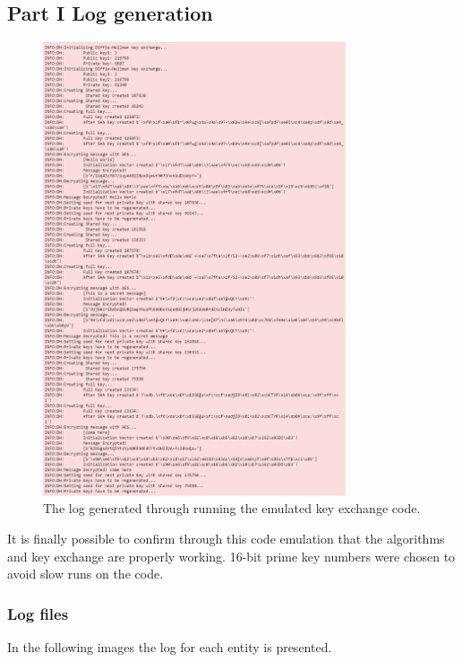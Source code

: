 \documentclass[letterpaper,12pt]{article}
\begin{document}
\subsection{Part I Log generation}

\begin{figure}[H]
    \centering
    \includegraphics[width=0.8\textwidth]{assets/diffie_hellman_log.png}
    \caption{The log generated through running the emulated key exchange code.}
    \label{fig:DH_LOG}
\end{figure}
It is finally possible to confirm through this code emulation that the algorithms and key exchange are properly working. 16-bit prime key numbers were chosen to avoid slow runs on the code.

\subsubsection{Log files}
In the following images the log for each entity is presented.
\end{document}
